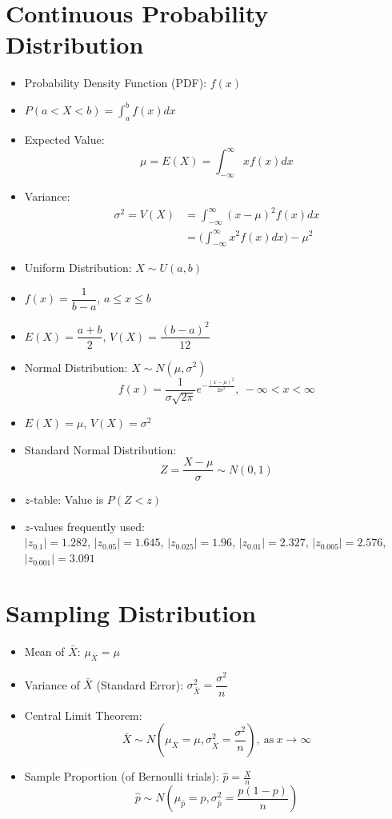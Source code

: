 \documentclass[%
 aip,
 jmp,%
 amsmath,amssymb,
 reprint,%
]{revtex4-1}
\begin{document}
\section{Continuous Probability Distribution}
\begin{itemize}[label={}]
\item Probability Density Function (PDF): $f(x)$
\item $P(a<X<b) = \int_{a}^{b}f(x)dx$
\item Expected Value: $$ \mu = E(X) = \int_{-\infty}^{\infty}xf(x)dx $$
\item Variance: 
\begin{equation*}\begin{aligned}
\sigma^2 = V(X) &= \int_{-\infty}^{\infty}(x-\mu)^2f(x)dx \\
&= \Big( \int_{-\infty}^{\infty}x^2f(x)dx \Big) - \mu^2
\end{aligned}\end{equation*}
\item Uniform Distribution: $X \sim U(a, b)$
\item $f(x) = \dfrac{1}{b-a}$, $a\leq x \leq b$
\item $E(X) = \dfrac{a+b}{2}$, $V(X) = \dfrac{(b-a)^2}{12}$
\item Normal Distribution: $X \sim N(\mu, \sigma^2)$
$$ f(x) = \frac{1}{\sigma\sqrt{2\pi}}e^{-\frac{(x-\mu)^2}{2\sigma^2}},\ -\infty < x < \infty $$
\vspace{0.01in}
\item $E(X) = \mu$, $V(X) = \sigma^2$
\item Standard Normal Distribution: $$Z = \frac{X-\mu}{\sigma} \sim N(0,1)$$
\item $z$-table: Value is $P(Z < z)$ 
\item $z$-values frequently used: \\
$|z_{0.1}|=1.282$, $|z_{0.05}|=1.645$, $|z_{0.025}|=1.96$, $|z_{0.01}|=2.327$, $|z_{0.005}|=2.576$, $|z_{0.001}|=3.091$
\end{itemize}

\section{Sampling Distribution}
\begin{itemize}[label={}]
\item Mean of $\bar{X}$: $\mu_{\bar{X}}=\mu$
\item Variance of $\bar{X}$ (Standard Error): $\sigma_{\bar{X}}^2 = \dfrac{\sigma^2}{n}$
\item Central Limit Theorem:
$$\bar{X} \sim N(\mu_{\bar{X}}=\mu, \sigma_{\bar{X}}^2=\frac{\sigma^2}{n}),\ \textrm{as}\ x \rightarrow \infty $$
\item Sample Proportion (of Bernoulli trials): $\hat{p}=\frac{X}{n}$
$$\hat{p} \sim N \left(\mu_{\hat{p}}=p, \sigma_{\hat{p}}^2=\frac{p(1-p)}{n} \right)$$
\end{itemize}
\end{document}

